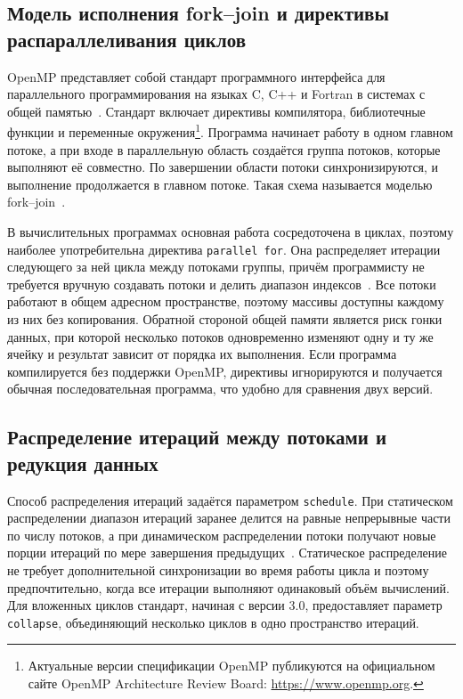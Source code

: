 \subsection{Модель исполнения fork--join и директивы распараллеливания циклов}

OpenMP представляет собой стандарт программного интерфейса для параллельного программирования на языках C, C++ и Fortran в системах с общей памятью~\cite{dagum1998openmp}. Стандарт включает директивы компилятора, библиотечные функции и переменные окружения\footnote{Актуальные версии спецификации OpenMP публикуются на официальном сайте OpenMP Architecture Review Board: \url{https://www.openmp.org}.}. Программа начинает работу в одном главном потоке, а при входе в параллельную область создаётся группа потоков, которые выполняют её совместно. По завершении области потоки синхронизируются, и выполнение продолжается в главном потоке. Такая схема называется моделью fork--join~\cite{chandra2001parallel}.

В вычислительных программах основная работа сосредоточена в циклах, поэтому наиболее употребительна директива \texttt{parallel for}. Она распределяет итерации следующего за ней цикла между потоками группы, причём программисту не требуется вручную создавать потоки и делить диапазон индексов~\cite{antonov2009openmp}. Все потоки работают в общем адресном пространстве, поэтому массивы доступны каждому из них без копирования. Обратной стороной общей памяти является риск гонки данных, при которой несколько потоков одновременно изменяют одну и ту же ячейку и результат зависит от порядка их выполнения. Если программа компилируется без поддержки OpenMP, директивы игнорируются и получается обычная последовательная программа, что удобно для сравнения двух версий.

\subsection{Распределение итераций между потоками и редукция данных}

Способ распределения итераций задаётся параметром \texttt{schedule}. При статическом распределении диапазон итераций заранее делится на равные непрерывные части по числу потоков, а при динамическом распределении потоки получают новые порции итераций по мере завершения предыдущих~\cite{antonov2009openmp}. Статическое распределение не требует дополнительной синхронизации во время работы цикла и поэтому предпочтительно, когда все итерации выполняют одинаковый объём вычислений. Для вложенных циклов стандарт, начиная с версии 3.0, предоставляет параметр \texttt{collapse}, объединяющий несколько циклов в одно пространство итераций.

